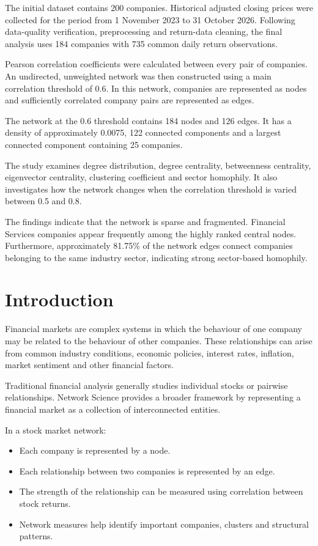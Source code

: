 \documentclass[11pt,a4paper]{article}
\begin{document}
The initial dataset contains 200 companies. Historical adjusted
closing prices were collected for the period from 1 November 2023
to 31 October 2026. Following data-quality verification,
preprocessing and return-data cleaning, the final analysis uses
184 companies with 735 common daily return observations.

Pearson correlation coefficients were calculated between every
pair of companies. An undirected, unweighted network was then
constructed using a main correlation threshold of 0.6. In this
network, companies are represented as nodes and sufficiently
correlated company pairs are represented as edges.

The network at the 0.6 threshold contains 184 nodes and 126 edges.
It has a density of approximately 0.0075, 122 connected components
and a largest connected component containing 25 companies.

The study examines degree distribution, degree centrality,
betweenness centrality, eigenvector centrality, clustering
coefficient and sector homophily. It also investigates how the
network changes when the correlation threshold is varied between
0.5 and 0.8.

The findings indicate that the network is sparse and fragmented.
Financial Services companies appear frequently among the highly
ranked central nodes. Furthermore, approximately 81.75\% of the
network edges connect companies belonging to the same industry
sector, indicating strong sector-based homophily.

\section{Introduction}

Financial markets are complex systems in which the behaviour of
one company may be related to the behaviour of other companies.
These relationships can arise from common industry conditions,
economic policies, interest rates, inflation, market sentiment
and other financial factors.

Traditional financial analysis generally studies individual
stocks or pairwise relationships. Network Science provides a
broader framework by representing a financial market as a
collection of interconnected entities.

In a stock market network:

\begin{itemize}
    \item Each company is represented by a node.
    \item Each relationship between two companies is represented
    by an edge.
    \item The strength of the relationship can be measured using
    correlation between stock returns.
    \item Network measures help identify important companies,
    clusters and structural patterns.
\end{itemize}
\end{document}
